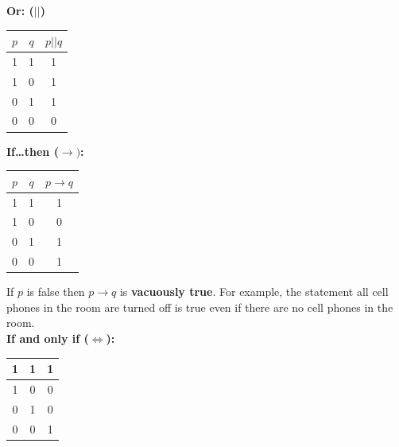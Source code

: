 \documentclass{article}
\begin{document}
    \noindent \textbf{Or: ($\vert\vert$)} \\

    \begin{center}
        \begin{tabular} {|c|c|c|}
            \hline
            $p$ & $q$ & $p||q$ \\
            \hline
            1   & 1   & 1      \\
            \hline
            1   & 0   & 1      \\
            \hline
            0   & 1   & 1      \\
            \hline
            0   & 0   & 0      \\
            \hline
        \end{tabular}
    \end{center}

    \noindent\textbf{If\dots then ($\rightarrow)$:} \\

    \begin{center}
        \begin{tabular} {|c|c|c|}
            \hline
            $p$ & $q$ & $p\rightarrow q$ \\
            \hline
            1   & 1   & 1                \\
            \hline
            1   & 0   & 0                \\
            \hline
            0   & 1   & 1                \\
            \hline
            0   & 0   & 1                \\
            \hline
        \end{tabular}
    \end{center}

    \noindent If $p$ is false then $p\rightarrow q$ is \textbf{vacuously true}.
    For example, the statement all cell phones in the room are turned off is true even
    if there are no cell phones in the room. \\

    \noindent \textbf{If and only if ($\iff$):} \\

    \begin{center}
        \begin{tabular} {|c|c|c|}
            \hline
            1 & 1 & 1 \\
            \hline
            1 & 0 & 0 \\
            \hline
            0 & 1 & 0 \\
            \hline
            0 & 0 & 1 \\
            \hline
        \end{tabular}
    \end{center}
\end{document}
